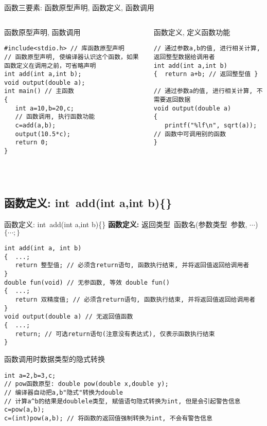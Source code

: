 \begin{frame}{函数三要素: 函数原型声明, 函数定义, 函数调用}
\begin{columns}[T]
\begin{beamerboxesrounded}{函数原型声明, 函数调用}
\begin{lstlisting}
#include<stdio.h> // 库函数原型声明
// 函数原型声明, 使编译器认识这个函数，如果函数定义在调用之前，可省略声明
int add(int a,int b); 
void output(double a);
int main() // 主函数
{
   int a=10,b=20,c;
   // 函数调用, 执行函数功能
   c=add(a,b); 
   output(10.5*c);
   return 0; 
}
\end{lstlisting}
\end{beamerboxesrounded}
\begin{beamerboxesrounded}{函数定义, 定义函数功能}
\begin{lstlisting}
// 通过参数a,b的值, 进行相关计算, 返回整型数据给调用者
int add(int a,int b)
{  return a+b; // 返回整型值 }

// 通过参数a的值, 进行相关计算, 不需要返回数据
void output(double a)
{  
   printf("%lf\n", sqrt(a)); // 函数中可调用别的函数
}
\end{lstlisting}
\end{beamerboxesrounded}
\end{columns}
~\\
\end{frame}

\subsection{函数定义: int\, add(int a,int b)\{\quad\}}

\begin{frame}{函数定义: int\, add(int a,int b)\{\quad\}}
\textbf{函数定义: } 返回类型\, 函数名(参数类型\, 参数, $\cdots$) $\{\cdots ; \}$
\begin{lstlisting}
int add(int a, int b)
{  ...;
   return 整型值; // 必须含return语句, 函数执行结束, 并将返回值返回给调用者
}
double fun(void) // 无参函数, 等效 double fun() 
{  ...;
   return 双精度值; // 必须含return语句, 函数执行结束, 并将返回值返回给调用者
}
void output(double a) // 无返回值函数
{  ...;
   return; // 可选return语句(注意没有表达式), 仅表示函数执行结束
}
\end{lstlisting}
\end{frame}

\begin{frame}{函数调用时数据类型的隐式转换}
\begin{lstlisting}
int a=2,b=3,c;
// pow函数原型: double pow(double x,double y);
// 编译器自动把a,b"隐式"转换为double
// 计算a^b的结果是doublele类型, 赋值语句隐式转换为int, 但是会引起警告信息
c=pow(a,b);
c=(int)pow(a,b); // 将函数的返回值强制转换为int, 不会有警告信息
\end{lstlisting}
\end{frame}

